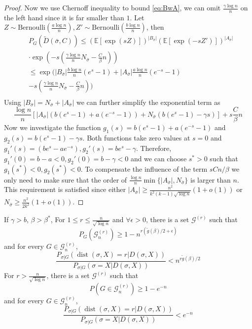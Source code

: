 \documentclass[entropy,article,submit,moreauthors,pdftex]{Definitions/mdpi}
\newcommand{\A}{\frac{a \log n}{n}}
\newcommand{\B}{\frac{b \log n}{n}}
\newcommand{\cG}{\mathcal{G}}
\newcommand{\1}{\mathbbm{1}}
\DeclareMathOperator{\Dist}{dist}
\begin{document}
\begin{proof}
	Now we use Chernoff inequality to bound \eqref{eq:BwA}, we can omit $\frac{\gamma \log n}{n}$ on the left hand since it is far smaller than $1$.
	Let $Z \sim \textrm{Bernoulli}(\A), Z' \sim \textrm{Bernoulli}(\B)$, then
	\begin{align*}
	&P_G(\widetilde{D}(\bar{\sigma}, C))
	\leq (\mathbb{E}[\exp(sZ)])^{|B_{\bar{\sigma}}|}(\mathbb{E}[\exp(-sZ')])^{|A_{\bar{\sigma}}|}\\
	&\cdot \exp(-s(\frac{\gamma \log n}{n} N_{\bar{\sigma}}  - \frac{C}{\beta}n)) \\
	& \leq \exp\Big(|B_{\bar{\sigma}}|\frac{b\log n}{n}(e^s -1) + |A_{\bar{\sigma}}|\frac{a\log n}{n} (e^{-s} - 1) \\
	&-s(\frac{\gamma \log n}{n} N_{\bar{\sigma}}  - \frac{C}{\beta}n)\Big) \\
	\end{align*}
	Using $|B_{\bar{\sigma}}| = N_{\bar{\sigma}} + |A_{\bar{\sigma}}|$ we can further simplify the exponential term as
	$$
	\frac{\log n}{n} [|A_{\bar{\sigma}}|(b(e^s -1)+ a(e^{-s} - 1)) +
	N_{\bar{\sigma}} (b(e^s - 1)-\gamma s)]  + s \frac{C}{\beta}n
	$$
	Now we investigate the function $g_1(s) = b(e^s -1)+ a(e^{-s} - 1)$ and $g_2(s) = b(e^s - 1)-\gamma s$.
	Both functions take zero values at $s=0$ and $g_1'(s) = (be^s - ae^{-s}), g_2'(s) = be^s -\gamma$.
	Therefore, $g_1'(0) = b-a<0, g_2'(0) = b - \gamma < 0$ and we can choose $s^*>0$ such that $g_1(s^*) < 0,g_2(s^*) < 0$.
	To compensate the influence of the term $sCn/\beta$ we only need to make sure that the order of $\frac{\log n}{n} \min\{|A_{\bar{\sigma}}|, N_{\bar{\sigma}}\}$ is larger than $n$.
	This requirement is satisfied since either $|A_{\bar{\sigma}}|\geq \frac{n^2}{k^2 (k-1)\sqrt{\log n}}(1+o(1))$ or $N_{\bar{\sigma}} \geq \frac{n^2}{2k^2}(1+o(1))$.
\end{proof}
\begin{Lemma}\label{prop:small}
	If $\gamma>b$, $\beta>\beta^\ast$,
	For $1\leq r \leq \frac{n}{\sqrt{\log n}}$
	and $\forall \epsilon > 0$, there is a set $\cG^{(r)}$ such that
	\begin{equation}\label{eq:Gr}
	P_G(\cG^{(r)}_n) \ge 1 - n^{r(\tilde{g}(\beta)/2 + \epsilon)}
	\end{equation}
	and
	for every $G\in\cG^{(r)}_n$,
	\begin{equation}\label{eq:psigmaX}
	\frac{P_{\sigma|G}(\Dist(\sigma, X)=r | D(\sigma, X))}
	{P_{\sigma|G}(\sigma=X | D(\sigma, X))} <
	n^{r \tilde{g}(\beta) /2}
	\end{equation}
	For $r> \frac{n}{\sqrt{\log n}}$, there is a set $\cG^{(r)}$ such that
	\begin{equation}\label{eq:Gr1}
	P(G\in\cG^{(r)}_n) \ge 1 - e^{-n}
	\end{equation}
	and
	for every $G\in\cG^{(r)}_n$,
	\begin{equation}\label{eq:psigmaX1}
	\frac{P_{\sigma|G}(\Dist(\sigma, X)=r | D(\sigma, X))}
	{P_{\sigma|G}(\sigma=X | D(\sigma, X))} <
	e^{-n}
	\end{equation}
\end{Lemma}
\end{document}
